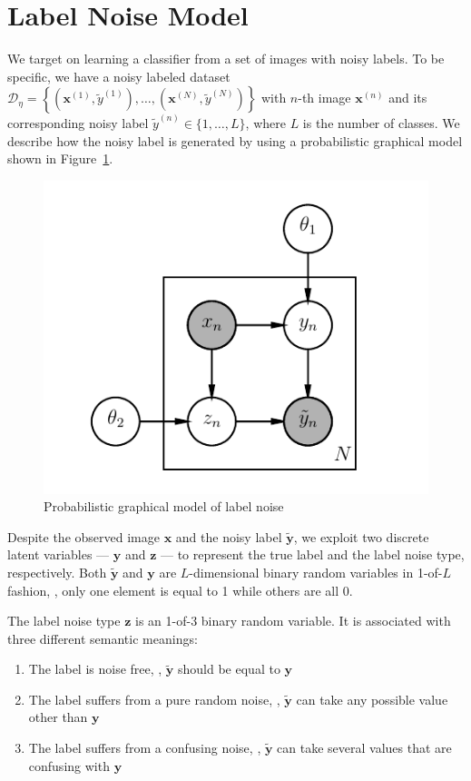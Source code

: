 \documentclass[10pt,twocolumn,letterpaper]{article}
\def\vec{\mathbf}
\begin{document}
\section{Label Noise Model} %
\label{sec:label_noise_model}
We target on learning a classifier from a set of images with noisy labels. To be specific, we have a noisy labeled dataset $\mathcal{D}_{\eta}=\left\{\left(\vec{x}^{(1)}, \tilde{y}^{(1)}\right), \dots, \left(\vec{x}^{(N)}, \tilde{y}^{(N)}\right)\right\}$ with $n$-th image $\vec{x}^{(n)}$ and its corresponding noisy label $\tilde{y}^{(n)} \in \{1,\dots,L\}$, where $L$ is the number of classes. We describe how the noisy label is generated by using a probabilistic graphical model shown in Figure~\ref{fig:noise_pgm}.

\begin{figure}[h!]
\begin{center}
\includegraphics[width=0.6\linewidth]{figure/pgm.pdf}
\end{center}
\caption{Probabilistic graphical model of label noise}
\label{fig:noise_pgm}
\end{figure}

Despite the observed image $\vec{x}$ and the noisy label $\tilde{\vec{y}}$, we exploit two discrete latent variables --- $\vec{y}$ and $\vec{z}$ --- to represent the true label and the label noise type, respectively. Both $\tilde{\vec{y}}$ and $\vec{y}$ are $L$-dimensional binary random variables in 1-of-$L$ fashion, \ie, only one element is equal to 1 while others are all 0.

The label noise type $\vec{z}$ is an 1-of-3 binary random variable. It is associated with three different semantic meanings:
\begin{enumerate}
    \item The label is noise free, \ie, $\tilde{\vec{y}}$ should be equal to $\vec{y}$
    \item The label suffers from a pure random noise, \ie, $\tilde{\vec{y}}$ can take any possible value other than $\vec{y}$
    \item The label suffers from a confusing noise, \ie, $\tilde{\vec{y}}$ can take several values that are confusing with $\vec{y}$
\end{enumerate}
\end{document}
